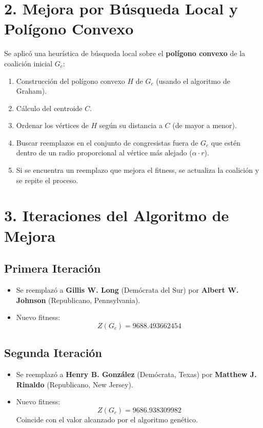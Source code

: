 \documentclass[12pt]{article}
\begin{document}
\section*{2. Mejora por Búsqueda Local y Polígono Convexo}

Se aplicó una heurística de búsqueda local sobre el \textbf{polígono convexo} de la coalición inicial $G_c$:

\begin{enumerate}
    \item Construcción del polígono convexo $H$ de $G_c$ (usando el algoritmo de Graham).
    \item Cálculo del centroide $C$.
    \item Ordenar los vértices de $H$ según su distancia a $C$ (de mayor a menor).
    \item Buscar reemplazos en el conjunto de congresistas fuera de $G_c$ que estén dentro de un radio proporcional al vértice más alejado ($\alpha \cdot r$).
    \item Si se encuentra un reemplazo que mejora el fitness, se actualiza la coalición y se repite el proceso.
\end{enumerate}

\section*{3. Iteraciones del Algoritmo de Mejora}

\subsection*{Primera Iteración}
\begin{itemize}
    \item Se reemplazó a \textbf{Gillis W. Long} (Demócrata del Sur) por \textbf{Albert W. Johnson} (Republicano, Pennsylvania).
    \item Nuevo fitness:
    \[
    Z(G_c) = 9688.493662454
    \]
\end{itemize}

\subsection*{Segunda Iteración}
\begin{itemize}
    \item Se reemplazó a \textbf{Henry B. González} (Demócrata, Texas) por \textbf{Matthew J. Rinaldo} (Republicano, New Jersey).
    \item Nuevo fitness:
    \[
    Z(G_c) = 9686.938309982
    \]
    Coincide con el valor alcanzado por el algoritmo genético.
\end{itemize}
\end{document}
